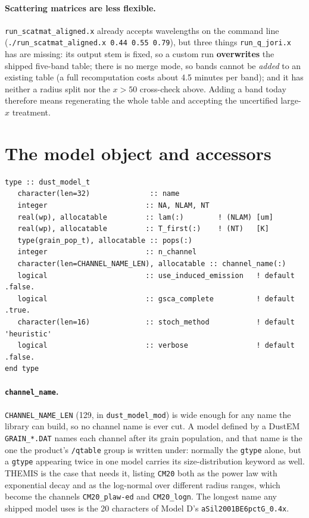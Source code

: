 \documentclass{my_memo}
\newcommand{\code}[1]{\texttt{#1}}
\begin{document}
\paragraph{Scattering matrices are less flexible.}
\code{run\_scatmat\_aligned.x} already accepts wavelengths on the command line
(\code{./run\_scatmat\_aligned.x 0.44 0.55 0.79}), but three things
\code{run\_q\_jori.x} has are missing: its output stem is fixed, so a custom run
\textbf{overwrites} the shipped five-band table; there is no merge mode, so
bands cannot be \emph{added} to an existing table (a full recomputation costs
about 4.5 minutes per band); and it has neither a radius split nor the $x>50$
cross-check above. Adding a band today therefore means regenerating the whole
table and accepting the uncertified large-$x$ treatment.


\section{The model object and accessors}

\begin{lstlisting}
type :: dust_model_t
   character(len=32)              :: name
   integer                       :: NA, NLAM, NT
   real(wp), allocatable         :: lam(:)        ! (NLAM) [um]
   real(wp), allocatable         :: T_first(:)    ! (NT)   [K]
   type(grain_pop_t), allocatable :: pops(:)
   integer                       :: n_channel
   character(len=CHANNEL_NAME_LEN), allocatable :: channel_name(:)
   logical                       :: use_induced_emission   ! default .false.
   logical                       :: gsca_complete          ! default .true.
   character(len=16)             :: stoch_method           ! default 'heuristic'
   logical                       :: verbose                ! default .false.
end type
\end{lstlisting}

\paragraph{\code{channel\_name}.} \code{CHANNEL\_NAME\_LEN} (129, in
\code{dust\_model\_mod}) is wide enough for any name the library can build, so
no channel name is ever cut. A model defined by a DustEM \code{GRAIN\_*.DAT}
names each channel after its grain population, and that name is the one the
product's \code{/qtable} group is written under: normally the \code{gtype}
alone, but a \code{gtype} appearing twice in one model carries its
size-distribution keyword as well. THEMIS is the case that needs it, listing
\code{CM20} both as the power law with exponential decay and as the log-normal
over different radius ranges, which become the channels \code{CM20\_plaw-ed}
and \code{CM20\_logn}. The longest name any shipped model uses is the 20
characters of Model D's \code{aSil2001BE6pctG\_0.4x}.
\end{document}
